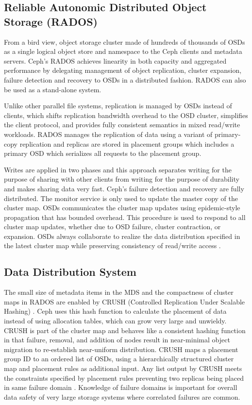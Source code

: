 \documentclass[9pt,twocolumn,twoside]{styles/osajnl}
\begin{document}
\subsection{Reliable Autonomic Distributed Object Storage (RADOS)}
From a bird view, object storage cluster made of hundreds of thousands
of OSDs as a single logical object store and namespace to the Ceph
clients and metadata servers. Ceph’s RADOS achieves linearity in both
capacity and aggregated performance by delegating management of object
replication, cluster expansion, failure detection and recovery to OSDs
in a distributed fashion. RADOS can also be used as a stand-alone
system.

Unlike other parallel file systems, replication is managed by OSDs
instead of clients, which shifts replication bandwidth overhead to the
OSD cluster, simplifies the client protocol, and provides fully
consistent semantics in mixed read/write workloads. RADOS manages the
replication of data using a variant of primary-copy replication and
replicas are stored in placement groups which includes a primary OSD
which serializes all requests to the placement group.

Writes are applied in two phases and this approach separates writing
for the purpose of sharing with other clients from writing for the
purpose of durability and makes sharing data very fast. Ceph’s failure
detection and recovery are fully distributed. The monitor service is
only used to update the master copy of the cluster map. OSDs
communicates the cluster map updates using epidemic-style propagation
that has bounded overhead. This procedure is used to respond to all
cluster map updates, whether due to OSD failure, cluster contraction,
or expansion. OSDs always collaborate to realize the data distribution
specified in the latest cluster map while preserving consistency of
read/write access \cite{paper-ceph-hadoop}.

\subsection{Data Distribution System}
The small size of metadata items in the MDS and the compactness of
cluster maps in RADOS are enabled by CRUSH (Controlled Replication
Under Scalable Hashing) \cite{MDS}. Ceph uses this hash function to
calculate the placement of data instead of using allocation tables,
which can grow very large and unwieldy. CRUSH is part of the cluster
map and behaves like a consistent hashing function in that failure,
removal, and addition of nodes result in near-minimal object migration
to re-establish near-uniform distribution. CRUSH maps a placement
group ID to an ordered list of OSDs, using a hierarchically structured
cluster map and placement rules as additional input. Any list output
by CRUSH meets the constraints specified by placement rules preventing
two replicas being placed in same failure domain
\cite{paper-Ceph}. Knowledge of failure domains is important for
overall data safety of very large storage systems where correlated
failures are common.
\end{document}
